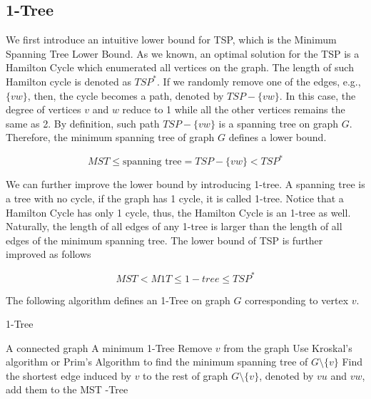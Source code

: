         \subsection{1-Tree}
            We first introduce an intuitive lower bound for TSP, which is the Minimum Spanning Tree Lower Bound. As we known, an optimal solution for the TSP is a Hamilton Cycle which enumerated all vertices on the graph. The length of such Hamilton cycle is denoted as $TSP^*$. If we randomly remove one of the edges, e.g., $\{vw\}$, then, the cycle becomes a path, denoted by $TSP - \{vw\}$. In this case, the degree of vertices $v$ and $w$ reduce to 1 while all the other vertices remains the same as 2. By definition, such path $TSP - \{vw\}$ is a spanning tree on graph $G$. Therefore, the minimum spanning tree of graph $G$ defines a lower bound.

            \begin{equation*}
                MST \le \text{spanning tree} = TSP - \{vw\} < TSP^*
            \end{equation*}

            We can further improve the lower bound by introducing 1-tree. A spanning tree is a tree with no cycle, if the graph has 1 cycle, it is called 1-tree. Notice that a Hamilton Cycle has only 1 cycle, thus, the Hamilton Cycle is an 1-tree as well. Naturally, the length of all edges of any 1-tree is larger than the length of all edges of the minimum spanning tree. The lower bound of TSP is further improved as follows

            \begin{equation*}
                MST < M1T \le 1-tree \le TSP^*
            \end{equation*}

            The following algorithm defines an 1-Tree on graph $G$ corresponding to vertex $v$.

            \begin{algorithm}
                \caption{1-Tree}
                \begin{algorithmic}
                    \Require A connected graph
                    \Ensure A minimum 1-Tree
                    \State Remove $v$ from the graph
                    \State Use Kroskal's algorithm or Prim's Algorithm to find the minimum spanning tree of $G \setminus \{v\}$
                    \State Find the shortest edge induced by $v$ to the rest of graph $G \setminus \{v\}$, denoted by $vu$ and $vw$, add them to the MST
                    \State {}-Tree
                \end{algorithmic}
            \end{algorithm}


